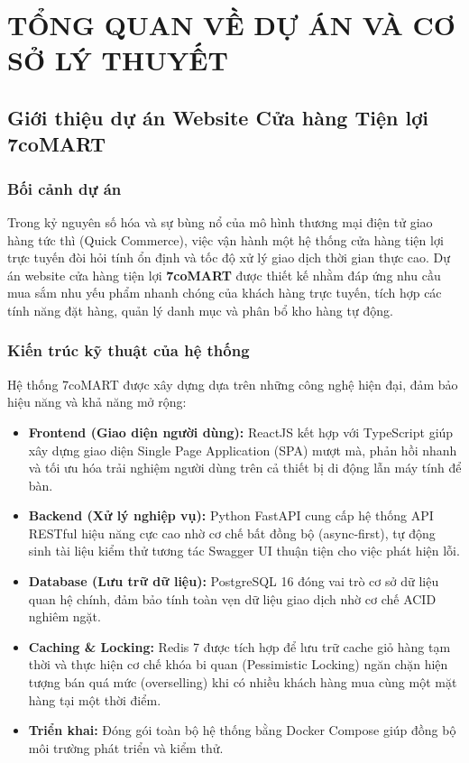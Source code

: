 \chapter{TỔNG QUAN VỀ DỰ ÁN VÀ CƠ SỞ LÝ THUYẾT}

\section{Giới thiệu dự án Website Cửa hàng Tiện lợi 7coMART}

\subsection{Bối cảnh dự án}
Trong kỷ nguyên số hóa và sự bùng nổ của mô hình thương mại điện tử giao hàng tức thì (Quick Commerce), việc vận hành một hệ thống cửa hàng tiện lợi trực tuyến đòi hỏi tính ổn định và tốc độ xử lý giao dịch thời gian thực cao. Dự án website cửa hàng tiện lợi \textbf{7coMART} được thiết kế nhằm đáp ứng nhu cầu mua sắm nhu yếu phẩm nhanh chóng của khách hàng trực tuyến, tích hợp các tính năng đặt hàng, quản lý danh mục và phân bổ kho hàng tự động.

\subsection{Kiến trúc kỹ thuật của hệ thống}
Hệ thống 7coMART được xây dựng dựa trên những công nghệ hiện đại, đảm bảo hiệu năng và khả năng mở rộng:
\begin{itemize}
    \item \textbf{Frontend (Giao diện người dùng):} ReactJS kết hợp với TypeScript giúp xây dựng giao diện Single Page Application (SPA) mượt mà, phản hồi nhanh và tối ưu hóa trải nghiệm người dùng trên cả thiết bị di động lẫn máy tính để bàn.
    \item \textbf{Backend (Xử lý nghiệp vụ):} Python FastAPI cung cấp hệ thống API RESTful hiệu năng cực cao nhờ cơ chế bất đồng bộ (async-first), tự động sinh tài liệu kiểm thử tương tác Swagger UI thuận tiện cho việc phát hiện lỗi.
    \item \textbf{Database (Lưu trữ dữ liệu):} PostgreSQL 16 đóng vai trò cơ sở dữ liệu quan hệ chính, đảm bảo tính toàn vẹn dữ liệu giao dịch nhờ cơ chế ACID nghiêm ngặt.
    \item \textbf{Caching \& Locking:} Redis 7 được tích hợp để lưu trữ cache giỏ hàng tạm thời và thực hiện cơ chế khóa bi quan (Pessimistic Locking) ngăn chặn hiện tượng bán quá mức (overselling) khi có nhiều khách hàng mua cùng một mặt hàng tại một thời điểm.
    \item \textbf{Triển khai:} Đóng gói toàn bộ hệ thống bằng Docker Compose giúp đồng bộ môi trường phát triển và kiểm thử.
\end{itemize}

